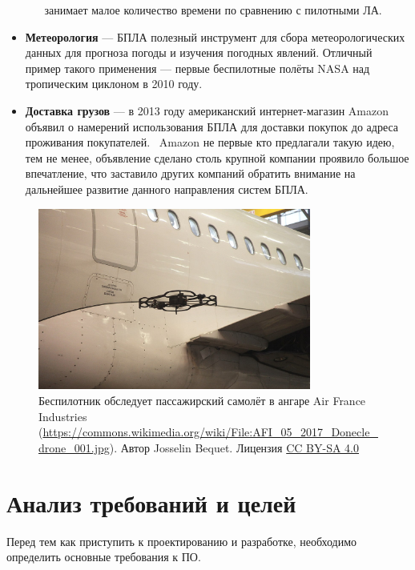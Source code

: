 \documentclass[specification,annotation]{itmo-student-thesis}
\begin{document}
\begin{itemize}
\begin{itemize}
        занимает малое количество времени по сравнению с пилотными ЛА.
    \end{itemize}
  \item \textbf{Метеорология} --- БПЛА полезный инструмент для сбора
    метеорологических данных для прогноза погоды и изучения погодных явлений.
    Отличный пример такого применения --- первые беспилотные полёты NASA над
    тропическим циклоном в 2010 году.~\cite{nasa-hurricane}
  \item \textbf{Доставка грузов} --- в 2013 году американский интернет-магазин
    Amazon объявил о намерений использования БПЛА для доставки покупок до адреса
    проживания покупателей.~\cite{cnn-amazon} Amazon не первые кто предлагали
    такую идею, тем не менее, объявление сделано столь крупной компании проявило
    большое впечатление, что заставило других компаний обратить внимание на
    дальнейшее развитие данного направления систем БПЛА.
\end{itemize}

\begin{figure}[!h]
  \caption{Беспилотник обследует пассажирский самолёт в ангаре Air France
  Industries
  (\url{https://commons.wikimedia.org/wiki/File:AFI_05_2017_Donecle_drone_001.jpg}).
  Автор Josselin Bequet. Лицензия
  \href{https://creativecommons.org/licenses/by-sa/4.0/deed.en}{CC BY-SA 4.0}
  }\label{pic:uav-inspect}
  \centering
  \includegraphics[width=0.8\textwidth]{uav-inspect}
\end{figure}

\section{Анализ требований и целей}\label{sec:analreqs}

Перед тем как приступить к проектированию и разработке, необходимо определить
основные требования к ПО.
\end{document}
